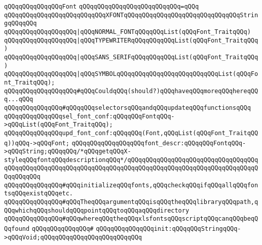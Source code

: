 \newline
\newline
\verb|qQQqqQQqqQQqqQQqFont|\newline
\verb|qQQqqQQqqQQqqQQqqQQqqQQqqQQq=qQQq|\newline
\verb|qQQqqQQqqQQqqQQqqQQqqQQqqQQqXFONTqQQqqQQqqQQqqQQqqQQqqQQqqQQqqQQqStringqQQqqQQq|\newline
\verb|qQQqqQQqqQQqqQQqqQQq|\verb#|qQQqNORMAL_FONTqQQqqQQqList(qQQqFont_TraitqQQq)#\newline
\verb|qQQqqQQqqQQqqQQqqQQq|\verb#|qQQqTYPEWRITERqQQqqQQqqQQqList(qQQqFont_TraitqQQq)#\newline
\verb|qQQqqQQqqQQqqQQqqQQq|\verb#|qQQqSANS_SERIFqQQqqQQqqQQqList(qQQqFont_TraitqQQq)#\newline
\verb|qQQqqQQqqQQqqQQqqQQq|\verb#|qQQqSYMBOLqQQqqQQqqQQqqQQqqQQqqQQqqQQqList(qQQqFont_TraitqQQq);#\newline
\verb|qQQqqQQqqQQqqQQqqQQq#qQQqCouldqQQq(should?)qQQqhaveqQQqmoreqQQqhereqQQq...qQQq|\newline
\newline
\newline
\verb|qQQqqQQqqQQqqQQq#qQQqqQQqselectorsqQQqandqQQqupdateqQQqfunctionsqQQq|\newline
\verb|qQQqqQQqqQQqqQQqsel_font_conf:qQQqqQQqFontqQQq->qQQqList(qQQqFont_TraitqQQq);|\newline
\verb|qQQqqQQqqQQqqQQqupd_font_conf:qQQqqQQq(Font,qQQqList(qQQqFont_TraitqQQq))qQQq->qQQqFont;|\newline
\newline
\verb|qQQqqQQqqQQqqQQqqQQqfont_descr:qQQqqQQqFontqQQq->qQQqString;qQQqqQQq/*qQQqgetqQQqX-styleqQQqfontqQQqdescriptionqQQq*/qQQqqQQqqQQqqQQqqQQqqQQqqQQqqQQqqQQqqQQqqQQqqQQqqQQqqQQqqQQqqQQqqQQqqQQqqQQqqQQqqQQqqQQqqQQqqQQqqQQqqQQqqQQqqQQqqQQq|\newline
\newline
\verb|qQQqqQQqqQQqqQQq#qQQqinitializeqQQqfonts,qQQqcheckqQQqifqQQqallqQQqfontsqQQqexistqQQqetc.|\newline
\verb|qQQqqQQqqQQqqQQq#qQQqTheqQQqargumentqQQqisqQQqtheqQQqlibraryqQQqpath,qQQqwhichqQQqshouldqQQqpointqQQqtoqQQqaqQQqdirectory|\newline
\verb|qQQqqQQqqQQqqQQq#qQQqwhereqQQqtheqQQqxlsfontsqQQqscriptqQQqcanqQQqbeqQQqfound|\newline
\verb|qQQqqQQqqQQqqQQq#|\newline
\verb|qQQqqQQqqQQqqQQqinit:qQQqqQQqStringqQQq->qQQqVoid;qQQqqQQqqQQqqQQqqQQqqQQqqQQq|\newline
